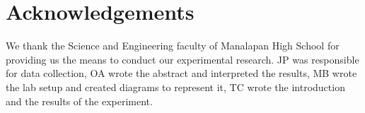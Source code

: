 \documentclass[reprint,amsmath,amssymb,aps,twoside]{revtex4-2} %
\begin{document}
    
    
\section{Acknowledgements}
We thank the Science and Engineering faculty of Manalapan High School for providing us the means to conduct our experimental research. JP was responsible for data collection, OA wrote the abstract and interpreted the results, MB wrote the lab setup and created diagrams to represent it, TC wrote the introduction and the results of the experiment.







\end{document}
